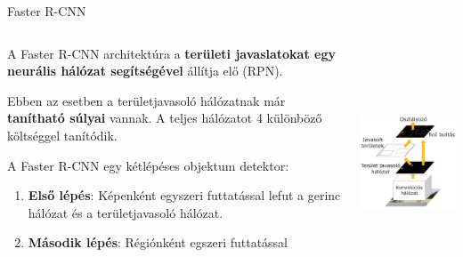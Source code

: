 \documentclass[english, aspectratio=169]{beamer}
\begin{document}
\begin{frame}{Faster R-CNN}
\begin{columns}
\begin{column}{.5\textwidth}
A Faster R-CNN architektúra a \textbf{területi javaslatokat egy neurális hálózat segítségével} állítja elő (RPN).\par\smallskip
Ebben az esetben a területjavasoló hálózatnak már \textbf{tanítható súlyai} vannak. A teljes hálózatot 4 különböző költséggel tanítódik.\par\smallskip
A Faster R-CNN egy kétlépéses objektum detektor:
\begin{enumerate}
	\item \textbf{Első lépés}: Képenként egyszeri futtatással lefut a gerinc hálózat és a területjavasoló hálózat. 
	\item \textbf{Második lépés}: Régiónként egszeri futtatással 
\end{enumerate}
\end{column}
\begin{column}{.5\textwidth}
\begin{center}
\includegraphics[width=6cm, height=7cm, keepaspectratio]{images/od_15.png}
\end{center}
\end{column}
\end{columns}
\end{frame}
\end{document}

